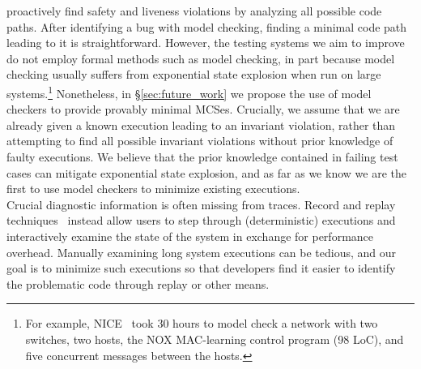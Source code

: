 proactively find safety and liveness violations by analyzing all possible code paths.
After identifying a bug with model checking, finding a minimal code path leading to it is
straightforward. However, the testing systems we aim to improve do not employ
formal methods such as model checking, in part because model checking usually suffers from exponential
state explosion when run on large systems.\footnote{For example, NICE~\cite{nice} took 30 hours to
model check a network with two switches, two hosts, the NOX MAC-learning
control program (98 LoC), and five concurrent
messages between the hosts.} Nonetheless, in \S\ref{sec:future_work} we propose the
use of model checkers to provide provably
minimal MCSes. Crucially, we assume that we are already given a known
execution leading to an invariant violation, rather than attempting to find all
possible invariant violations without prior knowledge of faulty executions. We
believe that the prior knowledge contained in failing test cases can mitigate exponential
state explosion, and as far as we know we are the first to use model checkers
to minimize existing executions.\\[0.5ex]
%
 Crucial diagnostic information is often missing from traces.
Record and replay
techniques~\cite{Geels:2006:RDD:1267359.1267386,lin2013defined,Zamfir:2010:EST:1755913.1755946,Yuan:2010:SED:1736020.1736038}
instead allow users to step through (deterministic) executions and interactively examine the
state of the system in exchange for performance overhead.
Manually examining long system executions can be tedious, and our goal is to
minimize such executions so that developers find it easier to identify the
problematic code through replay or other means.\\[0.5ex]

